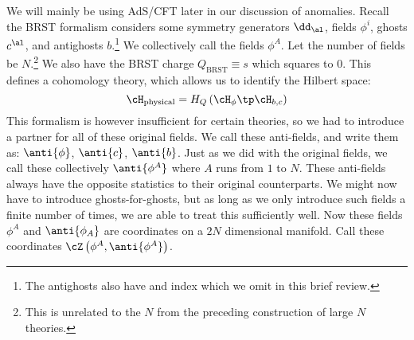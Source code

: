 \documentclass{booc}
\begin{document}
We will mainly be using AdS/CFT later in our discussion of anomalies.
Recall the BRST formalism considers some symmetry generators
$\dd_\al$, fields $\phi^i$, ghosts $c^{\al}$, and antighosts $b$.\footnote{
The antighosts also have and index which we omit in this brief review.}
We collectively call the fields $\phi^A$. Let the number of fields be $N$.\footnote{
This is unrelated to the $N$ from the preceding construction of large $N$ theories.}
We also have the BRST charge $Q_{\text{BRST}} \equiv s$ which squares to $0$.
This defines a cohomology theory, which allows us to identify the Hilbert space:
\begin{equation}
\cH_{\text{physical}} = 
H_Q\left( \cH_{\phi} \tp \cH_{b,c} \right)
\end{equation}
This formalism is however insufficient for certain theories, so we had
to introduce a partner for all of these original fields. 
We call these anti-fields, and write them as:
$\anti{\phi}$, $\anti{c}$, $\anti{b}$.
Just as we did with the original fields, we call these collectively $\anti{\phi^A}$
where $A$ runs from $1$ to $N$.
These anti-fields always have the opposite statistics to their original counterparts.
We might now have to introduce ghosts-for-ghosts, but as long as we only introduce such fields
a finite number of times, we are able to treat this sufficiently well. 
Now these fields $\phi^A$ and $\anti{\phi_A}$ are coordinates on a $2N$ dimensional manifold. 
Call these coordinates $\cZ\left( \phi^A ,  \anti{\phi^A}\right)$.
\end{document}
